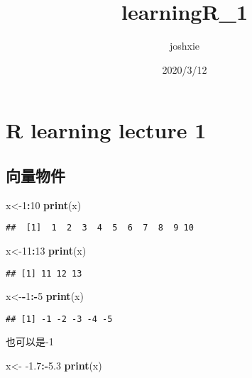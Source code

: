 \documentclass[]{article}
\title{learningR\_1}
\author{joshxie}
\date{2020/3/12}
\newenvironment{Shaded}{\begin{snugshade}}{\end{snugshade}}
\newcommand{\DecValTok}[1]{\textcolor[rgb]{0.00,0.00,0.81}{#1}}
\newcommand{\FloatTok}[1]{\textcolor[rgb]{0.00,0.00,0.81}{#1}}
\newcommand{\KeywordTok}[1]{\textcolor[rgb]{0.13,0.29,0.53}{\textbf{#1}}}
\newcommand{\NormalTok}[1]{#1}
\newcommand{\OperatorTok}[1]{\textcolor[rgb]{0.81,0.36,0.00}{\textbf{#1}}}
\newcommand{\StringTok}[1]{\textcolor[rgb]{0.31,0.60,0.02}{#1}}
\begin{document}
\maketitle

\hypertarget{r-learning-lecture-1}{%
\section{R learning lecture 1}\label{r-learning-lecture-1}}

\hypertarget{ux5411ux91cfux7269ux4ef6}{%
\subsection{向量物件}\label{ux5411ux91cfux7269ux4ef6}}

\begin{Shaded}
\begin{Highlighting}[]
\NormalTok{x<-}\DecValTok{1}\OperatorTok{:}\DecValTok{10}
\KeywordTok{print}\NormalTok{(x)}
\end{Highlighting}
\end{Shaded}

\begin{verbatim}
##  [1]  1  2  3  4  5  6  7  8  9 10
\end{verbatim}

\begin{Shaded}
\begin{Highlighting}[]
\NormalTok{x<-}\DecValTok{11}\OperatorTok{:}\DecValTok{13}
\KeywordTok{print}\NormalTok{(x)}
\end{Highlighting}
\end{Shaded}

\begin{verbatim}
## [1] 11 12 13
\end{verbatim}

\begin{Shaded}
\begin{Highlighting}[]
\NormalTok{x<-}\OperatorTok{-}\DecValTok{1}\OperatorTok{:-}\DecValTok{5}
\KeywordTok{print}\NormalTok{(x)}
\end{Highlighting}
\end{Shaded}

\begin{verbatim}
## [1] -1 -2 -3 -4 -5
\end{verbatim}

也可以是-1

\begin{Shaded}
\begin{Highlighting}[]
\NormalTok{x<-}\StringTok{ }\FloatTok{-1.7}\OperatorTok{:-}\FloatTok{5.3}
\KeywordTok{print}\NormalTok{(x)}
\end{Highlighting}
\end{Shaded}
\end{document}
